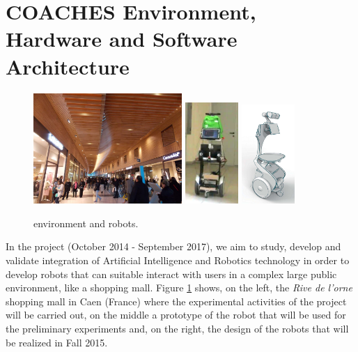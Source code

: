 \section{COACHES Environment, Hardware and Software Architecture}
\vspace{-0.1cm}
\begin{figure}[t!]
\centering
\includegraphics[height=4.2cm]{fig/rivedelorne}\hspace{0.1cm}\hfill
\includegraphics[width=0.18\textwidth]{fig/diago3}\hspace{0.1cm}\hfill
\includegraphics[width=0.18\textwidth]{fig/coaches_robot}
\caption{{\coaches} environment and robots.}
\label{fig:env}
\end{figure}

In the {\coaches} project (October 2014 - September 2017), we aim to study, develop and validate integration of Artificial Intelligence and Robotics technology in order to develop robots that can suitable interact with users in a complex large public environment, like a shopping mall.
Figure \ref{fig:env} shows, on the left, the \emph{Rive de l'orne} shopping mall in Caen (France) where the experimental activities of the project will be carried out, on the middle a prototype of the robot that will be used for the preliminary experiments and, on the right, the design of the robots that will be realized in Fall 2015.

